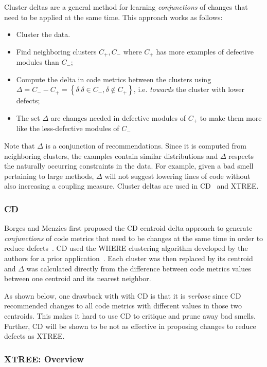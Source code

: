 \documentclass[twocolumn,5p]{elsarticle}
\theoremstyle{break}
\begin{document}
	Cluster deltas are a general method
	for learning {\em conjunctions} of changes
	that need to be applied at the same time. 
	This approach works as follows:
	\begin{itemize}
		\item Cluster the data. 
		\item Find
		neighboring clusters $C_+,C_-$ where $C_+$ has more examples of defective
		modules than $C_-$;
		\item Compute the  delta   in code metrics between the clusters using \mbox{$\Delta = C_- - C_+ = \left\{\delta|\delta\in C_-, \delta \notin C_+\right\}$}, i.e.
		{\em towards} the cluster with lower defects;
		\item The set $\Delta$ are changes needed in defective modules of $C_+$ to
		make them more like the less-defective modules of $C_-$
	\end{itemize}
	Note that $\Delta$ is a conjunction of  recommendations.
	Since it is computed
	from neighboring clusters, the examples contain similar distributions and $\Delta$ respects the naturally occurring constraints in the data. For example,
	given a bad smell pertaining to large methods,   $\Delta$   will not  suggest lowering lines of code
	without also increasing a coupling measure. 
	Cluster deltas are used in CD~\cite{me12c} and XTREE.
	
	
	
	\subsubsection{CD}\label{sec:cdcd}
	Borges and Menzies first proposed the CD centroid delta approach to
	generate {\em conjunctions} of code metrics
	that need to be changes at the same time
	in order to reduce defects~\cite{me12c}.
	CD used the WHERE clustering algorithm developed by the
	authors for a prior application~\cite{localvsglobal}.
	Each cluster was then replaced by its centroid
	and $\Delta$ was calculated directly from the difference
	between code metrics values between one centroid
	and its nearest neighbor.
	
	
	As shown below, one drawback with with CD is that it is {\em verbose}
	since
	CD   recommended changes to all code
	metrics with different values in those two centroids. 
	This makes it hard to use CD to   critique and prune away bad smells. Further, CD will be shown to be
	not as effective
	in proposing changes to reduce defects as XTREE.
	
	\subsubsection{XTREE: Overview}
	
\end{document}
